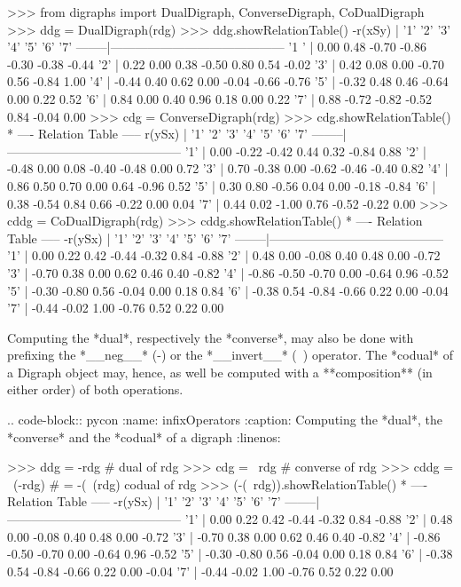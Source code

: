 {   >>> from digraphs import DualDigraph, ConverseDigraph, CoDualDigraph
   >>> ddg = DualDigraph(rdg)
   >>> ddg.showRelationTable()
    -r(xSy) |  '1'    '2'   '3'  '4'   '5'    '6'  '7'	  
    --------|------------------------------------------
    '1 '    |  0.00  0.48 -0.70 -0.86 -0.30 -0.38 -0.44	 
    '2'     |  0.22  0.00  0.38 -0.50  0.80  0.54 -0.02	 
    '3'     |  0.42  0.08  0.00 -0.70  0.56 -0.84  1.00	 
    '4'     | -0.44  0.40  0.62  0.00 -0.04 -0.66 -0.76	 
    '5'     | -0.32  0.48  0.46 -0.64  0.00  0.22  0.52	 
    '6'     |  0.84  0.00  0.40  0.96  0.18  0.00  0.22	 
    '7'     |  0.88 -0.72 -0.82 -0.52  0.84 -0.04  0.00
   >>> cdg = ConverseDigraph(rdg)
   >>> cdg.showRelationTable()
    * ---- Relation Table -----
     r(ySx) |  '1'    '2'   '3'   '4'   '5'   '6'   '7'	  
    --------|------------------------------------------
    '1'     |  0.00 -0.22 -0.42  0.44  0.32 -0.84  0.88	 
    '2'     | -0.48  0.00  0.08 -0.40 -0.48  0.00  0.72	 
    '3'     |  0.70 -0.38  0.00 -0.62 -0.46 -0.40  0.82	 
    '4'     |  0.86  0.50  0.70  0.00  0.64 -0.96  0.52	 
    '5'     |  0.30  0.80 -0.56  0.04  0.00 -0.18 -0.84	 
    '6'     |  0.38 -0.54  0.84  0.66 -0.22  0.00  0.04	 
    '7'     |  0.44  0.02 -1.00  0.76 -0.52 -0.22  0.00	 
   >>> cddg = CoDualDigraph(rdg)
   >>> cddg.showRelationTable()
    * ---- Relation Table -----
    -r(ySx) |  '1'    '2'   '3'   '4'   '5'   '6'   '7'	    
    --------|------------------------------------------
    '1'     |  0.00  0.22  0.42 -0.44 -0.32  0.84 -0.88	 
    '2'     |  0.48  0.00 -0.08  0.40  0.48  0.00 -0.72	 
    '3'     | -0.70  0.38  0.00  0.62  0.46  0.40 -0.82	 
    '4'     | -0.86 -0.50 -0.70  0.00 -0.64  0.96 -0.52	 
    '5'     | -0.30 -0.80  0.56 -0.04  0.00  0.18  0.84	 
    '6'     | -0.38  0.54 -0.84 -0.66  0.22  0.00 -0.04	 
    '7'     | -0.44 -0.02  1.00 -0.76  0.52  0.22  0.00	 

Computing the *dual*, respectively the *converse*, may also be done with prefixing the *__neg__* (-) or the *__invert__* (~) operator. The *codual* of a Digraph object may, hence, as well be computed with a **composition** (in either order) of both operations.

.. code-block:: pycon
   :name: infixOperators
   :caption: Computing the *dual*, the *converse* and the *codual* of a digraph
   :linenos:

   >>> ddg = -rdg   # dual of rdg
   >>> cdg = ~rdg   # converse of rdg
   >>> cddg = ~(-rdg) # = -(~(rdg) codual of rdg
   >>> (-(~rdg)).showRelationTable()
    * ---- Relation Table -----
    -r(ySx) |  '1'    '2'   '3'   '4'   '5'   '6'   '7'	    
    --------|------------------------------------------
    '1'     |  0.00  0.22  0.42 -0.44 -0.32  0.84 -0.88	 
    '2'     |  0.48  0.00 -0.08  0.40  0.48  0.00 -0.72	 
    '3'     | -0.70  0.38  0.00  0.62  0.46  0.40 -0.82	 
    '4'     | -0.86 -0.50 -0.70  0.00 -0.64  0.96 -0.52	 
    '5'     | -0.30 -0.80  0.56 -0.04  0.00  0.18  0.84	 
    '6'     | -0.38  0.54 -0.84 -0.66  0.22  0.00 -0.04	 
    '7'     | -0.44 -0.02  1.00 -0.76  0.52  0.22  0.00	 

}
